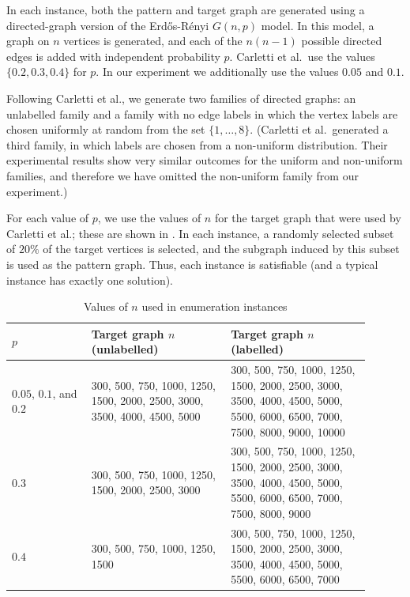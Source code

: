 In each instance, both the pattern and target graph are generated using a directed-graph
version of the Erd\H{o}s-Rényi $G(n,p)$ model.  In this model, a graph on $n$ vertices
is generated, and each of the $n(n-1)$ possible directed edges is added with independent
probability $p$.  Carletti et al.\ use the values $\{0.2, 0.3, 0.4\}$ for $p$. In our experiment
we additionally use the values $0.05$ and $0.1$.

Following Carletti et al., we generate two families of directed graphs: an unlabelled family
and a family with no edge labels in which the vertex labels are chosen uniformly at random
from the set $\{1,\dots,8\}$.  (Carletti et al.\ generated a third family, in which labels
are chosen from a non-uniform distribution.  Their experimental results show very similar
outcomes for the uniform and non-uniform families, and therefore we have omitted the non-uniform
family from our experiment.)

For each value of $p$, we use the values
of $n$ for the target graph that were used by Carletti et al.; these are shown in .
In each instance, a randomly selected subset of $20\%$ of the target vertices is selected,
and the subgraph induced by this subset is used as the pattern graph.  Thus, each instance
is satisfiable (and a typical instance has exactly one solution).

\begin{table}[htb]
\centering
\footnotesize
 \begin{tabular}{p{0.2\linewidth} p{0.35\linewidth} p{0.35\linewidth}}
 \toprule
     $p$ & Target graph $n$ (unlabelled) & Target graph $n$ (labelled) \\ [0.5ex]
 \midrule
     $0.05$, $0.1$, and $0.2$ &
         300, 500, 750, 1000, 1250, 1500, 2000, 2500, 3000, 3500, 4000, 4500, 5000 &
         300, 500, 750, 1000, 1250, 1500, 2000, 2500, 3000, 3500, 4000, 4500, 5000,
         5500, 6000, 6500, 7000, 7500, 8000, 9000, 10000\\
     \rule{0pt}{2.3ex}$0.3$ & 
        300, 500, 750, 1000, 1250, 1500, 2000, 2500, 3000 &
        300, 500, 750, 1000, 1250, 1500, 2000, 2500, 3000, 3500, 4000, 4500, 5000,
        5500, 6000, 6500, 7000, 7500, 8000, 9000 \\
     \rule{0pt}{2.3ex}$0.4$ & 300, 500, 750, 1000, 1250, 1500 &
        300, 500, 750, 1000, 1250, 1500, 2000, 2500, 3000, 3500, 4000, 4500, 5000, 5500, 6000, 6500, 7000 \\
 \bottomrule
\end{tabular}
\caption{Values of $n$ used in enumeration instances}
\label{tab:carletti-n}
\end{table}

